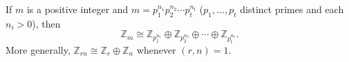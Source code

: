 If $m$ is a positive integer and $m = p_1^{n_1}p_2^{n_2}\cdots p_t^{n_t}$ ($p_1, \ldots, p_t$ distinct primes and each $n_i > 0$), then
$$\mathbb{Z}_m \cong \mathbb{Z}_{p_1^{n_1}} \oplus \mathbb{Z}_{p_2^{n_2}} \oplus \cdots \oplus \mathbb{Z}_{p_t^{n_t}}.$$
More generally, $\mathbb{Z}_{rn} \cong \mathbb{Z}_r \oplus \mathbb{Z}_n$ whenever $(r,n) = 1$.
